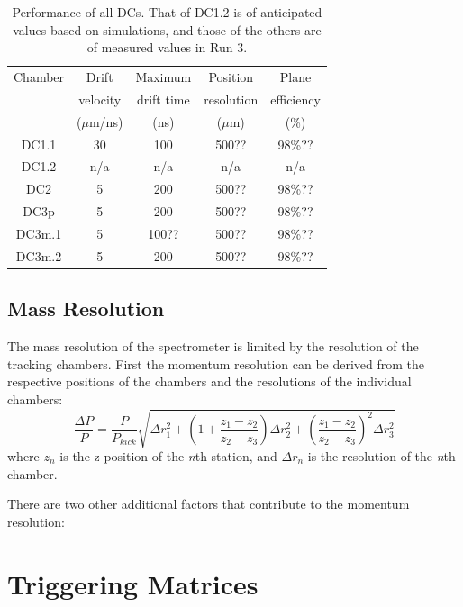\begin{table}[bthp]\centering
  \caption{Performance of all DCs.
    That of DC1.2 is of anticipated values based on simulations,
    and those of the others are of measured values in Run 3.}
  \label{tab:cham:performance}
  \begin{tabular}{c|cccc}
    \hline
    Chamber & Drift       & Maximum    & Position   & Plane \\
            & velocity    & drift time & resolution & efficiency \\
            & ($\mu$m/ns) & (ns)       & ($\mu$m)   & (\%) \\ 
    \hline
    DC1.1   &    30       &     100    &   500??    & 98\%?? \\
    DC1.2   &    n/a      &     n/a    &   n/a      & n/a    \\
    DC2     &     5       &     200    &   500??    & 98\%?? \\
    DC3p    &     5       &     200    &   500??    & 98\%?? \\
    DC3m.1  &     5       &     100??  &   500??    & 98\%?? \\
    DC3m.2  &     5       &     200    &   500??    & 98\%?? \\
    \hline
  \end{tabular}
\end{table}

\subsection{Mass Resolution}

The mass resolution of the spectrometer is limited by the resolution of the tracking chambers.
First the momentum resolution can be derived from the respective positions of the chambers and the
resolutions of the individual chambers:
\begin{equation}
\frac{\Delta P}{P} = \frac{P}{P_{kick}} \sqrt{\Delta r_1 ^2 + \left( 1 + \frac{z_1 - z_2}{z_2 - z_3} \right) \Delta r_2^2 +
	\left( \frac{z_1 - z_2}{z_2 - z_3} \right)^2 \Delta r_3^2 }
\end{equation}
where $z_n$ is the z-position of the \emph{n}th station, and $\Delta r_n$ is
the resolution of the \emph{n}th chamber.

There are two other additional factors that contribute to the momentum resolution: 


\section{Triggering Matrices}


